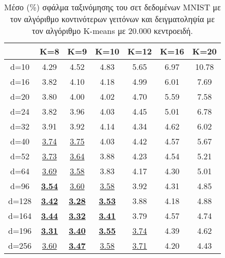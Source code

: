 \begin{table}[H]
\singlespacing
\centering
\label{tab:table7}
\caption{Μέσο (\%) σφάλμα ταξινόμησης του σετ δεδομένων \textlatin{MNIST} με τον αλγόριθμο κοντινότερων γειτόνων και δειγματοληψία με τον αλγόριθμο \textlatin{K-means} με 20.000 κεντροειδή.}
\vspace*{5mm}
\begin{tabular}{|c|c|c|c|c|c|c|}
\hline
& K=8 & K=9 & K=10 & K=12 & K=16 & K=20 \\
\hline
d=10 & 4.29 & 4.52 & 4.83 & 5.65 & 6.97 & 10.78 \\
d=16 & 3.82 & 4.10 & 4.18 & 4.99 & 6.01 & 7.69 \\
d=20 & 3.80 & 4.00 & 4.02 & 4.70 & 5.59 & 7.58 \\
d=24 & 3.82 & 3.96 & 4.03 & 4.45 & 5.01 & 6.78 \\
d=32 & 3.91 & 3.92 & 4.14 & 4.34 & 4.62 & 6.02 \\
d=40 & \underline{3.74} & \underline{3.75} & 4.03 & 4.42 & 4.57 & 5.67 \\
d=52 & \underline{3.73} & \underline{3.64} & 3.88 & 4.23 & 4.54 & 5.21 \\
d=64 & \underline{3.69} & \underline{3.58} & 3.83 & 4.17 & 4.30 & 5.01 \\
d=96 & \underline{\textbf{3.54}} & \underline{3.60} & \underline{3.58} & 3.92 & 4.31 & 4.85 \\
d=128 & \underline{\textbf{3.42}} & \underline{\textbf{3.28}} & \underline{\textbf{3.53}} & 3.88 & 4.18 & 4.88 \\
d=164 & \underline{\textbf{3.44}} & \underline{\textbf{3.32}} & \underline{\textbf{3.41}} & 3.79 & 4.57 & 4.74 \\
d=196 & \underline{\textbf{3.31}} & \underline{\textbf{3.40}} & \underline{\textbf{3.55}} & \underline{3.74} & 4.39 & 4.62 \\
d=256 & \underline{3.60} & \underline{\textbf{3.47}} & \underline{3.58} & \underline{3.71} & 4.20 & 4.43 \\
\hline
\end{tabular}
\end{table}

